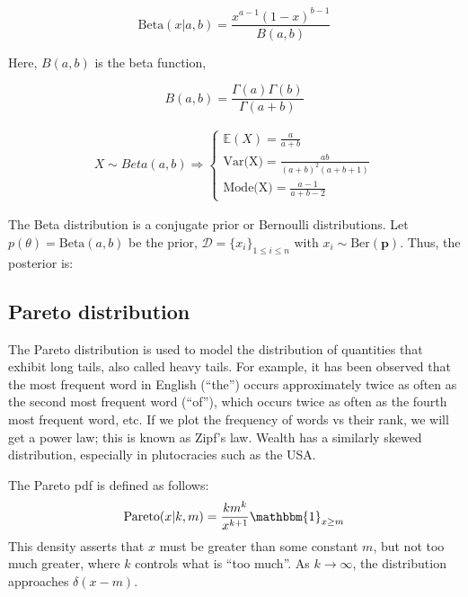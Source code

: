 \documentclass[12pt, a4paper]{article}
\theoremstyle{definition}
\numberwithin{figure}{section}
\numberwithin{equation}{section}
\numberwithin{table}{section}
\begin{document}
\begin{equation}
\text{Beta}(x|a, b) = \frac{x^{a-1} (1 - x)^{b-1}}{B(a, b)}
\end{equation}

Here, $B(a, b)$ is the beta function,

\begin{equation}
B(a, b) = \frac{\Gamma(a) \Gamma(b)}{\Gamma(a + b)}
\end{equation}

\begin{align}
X \sim Beta(a,b) \Rightarrow
\left\{
\begin{array}{l}
\mathbb{E}(X)=\frac{a}{a+b} \\ [1em]
\text{Var(X)}=\frac{ab}{(a+b)^2(a+b+1)} \\ [1em]
\text{Mode(X)}=\frac{a-1}{a+b-2}
\end{array}
\right.
\end{align}

The Beta distribution is a conjugate prior or Bernoulli distributions. Let $p(\theta)=\text{Beta}(a,b)$ be the prior, $\mathcal{D}=\{x_i\}_{1 \leq i \leq n}$ with $x_i \sim \text{Ber}(\textbf{p})$. Thus, the posterior is:


\subsection{Pareto distribution}
The Pareto distribution is used to model the distribution of quantities that exhibit long tails, also called heavy tails. For example, it has been observed that the most frequent word in English (“the”) occurs approximately twice as often as the second most frequent word (“of”), which occurs twice as often as the fourth most frequent word, etc. If we plot the frequency of words vs their rank, we will get a power law; this is known as Zipf’s law. Wealth has a similarly skewed distribution, especially in plutocracies such as the USA.

The Pareto pdf is defined as follows:
\begin{equation}
    \text{Pareto}(x | k, m) = \frac{k m^k}{x^{k+1}} \mathbbm{1}_{x \geq m}
\end{equation}
This density asserts that $x$ must be greater than some constant $m$, but not too much greater, where $k$ controls what is “too much”. As $k \to \infty$, the distribution approaches $\delta(x - m)$.
\end{document}
